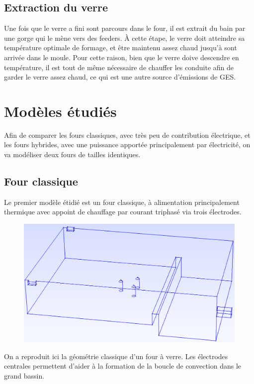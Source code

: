 \documentclass[12pt, a4paper, french, BCOR = 0pt, DIV = 10]{scrartcl}
\begin{document}
    \subsection{Extraction du verre}
    Une fois que le verre a fini sont parcours dans le four, il est extrait du bain par une gorge qui le mène vers des feeders. À cette étape, le verre doit atteindre sa température optimale de formage, et être maintenu assez chaud jusqu'à sont arrivée dans le moule. Pour cette raison, bien que le verre doive descendre en température, il est tout de même nécessaire de chauffer les conduite afin de garder le verre assez chaud, ce qui est une autre source d'émissions de GES.

    \section{Modèles étudiés}
    Afin de comparer les fours classiques, avec très peu de contribution électrique, et les fours hybrides, avec une puissance apportée principalement par électricité, on va modéliser deux fours de tailles identiques.

    \subsection{Four classique}
    Le premier modèle étidié est un four classique, à alimentation principalement thermique avec appoint de chauffage par courant triphasé via trois électrodes.

    \begin{center}
        \begin{figure}[H]
            \includegraphics[width=0.7\linewidth]{FourWall.png}
        \end{figure}
    \end{center}

    On a reproduit ici la géométrie classique d'un four à verre. Les électrodes centrales permettent d'aider à la formation de la boucle de convection dans le grand bassin.
\end{document}
